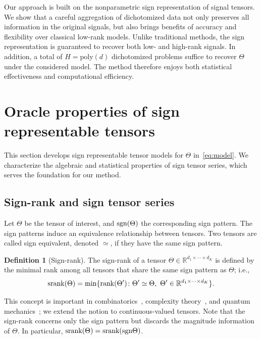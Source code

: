 \documentclass{article}
\theoremstyle{plain}
\theoremstyle{definition}
\newtheorem{defn}{Definition}
\def\sign{\textup{sgn}}
\def\srank{\textup{srank}}
\def\rank{\textup{rank}}
\begin{document}
Our approach is built on the nonparametric sign representation of signal tensors. We show that a careful aggregation of dichotomized data not only preserves all information in the original signals, but also brings benefits of accuracy and flexibility over classical low-rank models. Unlike traditional methods, the sign representation is guaranteed to recover both low- and high-rank signals. In addition, a total of $H=\text{poly}(d)$ dichotomized problems suffice to recover $\Theta$ under the considered model.  The method therefore enjoys both statistical effectiveness and computational efficiency. 

\section{Oracle properties of sign representable tensors}\label{sec:representation}
This section develops sign representable tensor models for $\Theta$ in~\eqref{eq:model}. We characterize the algebraic and statistical properties of sign tensor series, which serves the foundation for our method. 


\subsection{Sign-rank and sign tensor series}\label{sec:sign-rank}
Let $\Theta$ be the tensor of interest, and $\sign (\Theta)$ the corresponding sign pattern. The sign patterns induce an equivalence relationship between tensors. Two tensors are called sign equivalent, denoted $\simeq$, if they have the same sign pattern.

\vspace{.1cm}
\begin{defn}[Sign-rank]
The sign-rank of a tensor $\Theta\in\mathbb{R}^{d_1\times \cdots \times d_K}$ is defined by the minimal rank among all tensors that share the same sign pattern as $\Theta$; i.e.,
\[
\srank(\Theta) = \min \{\rank(\Theta')\colon  \Theta'\simeq \Theta,\ \Theta'\in\mathbb{R}^{d_1\times \cdots \times d_K}\}.
\]
\end{defn}
This concept is important in combinatorics~\citep{cohn2013fast}, complexity theory~\citep{alon2016sign}, and quantum mechanics~\citep{de2003nondeterministic}; we extend the notion to continuous-valued tensors. Note that the sign-rank concerns only the sign pattern but discards the magnitude information of $\Theta$. In particular, $\srank(\Theta)=\srank(\sign \Theta)$. 
\end{document}
